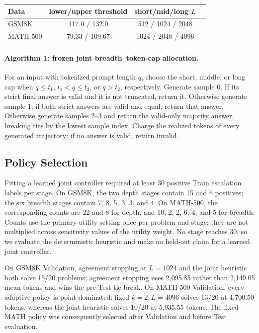 \documentclass[runningheads]{llncs}
\begin{document}
\begin{center}
\small
\begin{tabular}{lccc}
\toprule
Data & lower/upper threshold & short/mid/long $L$ \\
\midrule
GSM8K & 117.0 / 132.0 & 512 / 1024 / 2048 \\
MATH-500 & 79.33 / 109.67 & 1024 / 2048 / 4096 \\
\bottomrule
\end{tabular}
\end{center}

\paragraph{Algorithm 1: frozen joint breadth--token-cap allocation.}
For an input with tokenized prompt length $q$, choose the short, middle, or long
cap when $q\leq t_1$, $t_1<q\leq t_2$, or $q>t_2$, respectively. Generate
sample 0. If its strict final answer is valid and it is not truncated, return
it. Otherwise generate sample 1; if both strict answers are valid and equal,
return that answer. Otherwise generate samples 2--3 and return the valid-only
majority answer, breaking ties by the lowest sample index. Charge the realized
tokens of every generated trajectory; if no answer is valid, return invalid.

\subsection{Policy Selection}

Fitting a learned joint controller required at least 30 positive Train
escalation labels per stage. On GSM8K, the two depth stages contain 15 and 6
positives; the six breadth stages contain 7, 8, 5, 3, 3, and 4. On MATH-500,
the corresponding counts are 22 and 8 for depth, and 10, 2, 2, 6, 4, and 5
for breadth. Counts use the primary utility setting once per problem and stage;
they are not multiplied across sensitivity values of the utility weight.
No stage reaches 30, so we evaluate the deterministic heuristic and make no
held-out claim for a learned joint controller.

On GSM8K Validation, agreement stopping at $L=1024$ and the joint heuristic
both solve 15/20 problems; agreement stopping uses 2,095.85 rather than
2,149.05 mean tokens and wins the pre-Test tie-break. On MATH-500 Validation,
every adaptive policy is point-dominated: fixed $k=2,L=4096$ solves 13/20 at
4,700.50 tokens, whereas the joint heuristic solves 10/20 at 5,935.55 tokens.
The fixed MATH policy was consequently selected after Validation and before
Test evaluation.
\end{document}
